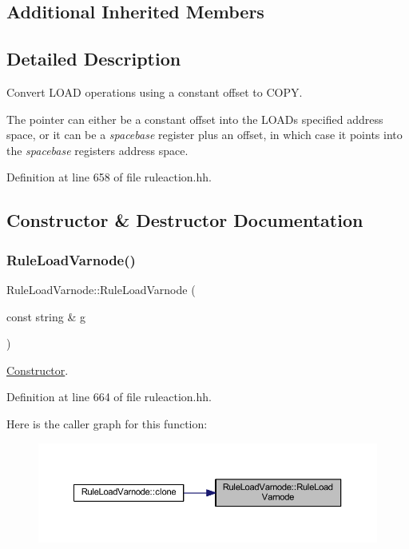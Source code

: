 \subsection*{Additional Inherited Members}


\subsection{Detailed Description}
Convert L\+O\+AD operations using a constant offset to C\+O\+PY. 

The pointer can either be a constant offset into the L\+O\+AD\textquotesingle{}s specified address space, or it can be a {\itshape spacebase} register plus an offset, in which case it points into the {\itshape spacebase} register\textquotesingle{}s address space. 

Definition at line 658 of file ruleaction.\+hh.



\subsection{Constructor \& Destructor Documentation}
\mbox{\label{class_rule_load_varnode_a1e78f437e9ff5a21f6b2fe3ffa97ccda}} 
\subsubsection{\texorpdfstring{RuleLoadVarnode()}{RuleLoadVarnode()}}
{\footnotesize\ttfamily Rule\+Load\+Varnode\+::\+Rule\+Load\+Varnode (\begin{DoxyParamCaption}\item[{const string \&}]{g }\end{DoxyParamCaption})\hspace{0.3cm}{\ttfamily [inline]}}



\mbox{\hyperlink{class_constructor}{Constructor}}. 



Definition at line 664 of file ruleaction.\+hh.

Here is the caller graph for this function\+:
\nopagebreak
\begin{figure}[H]
\begin{center}
\leavevmode
\includegraphics[width=350pt]{class_rule_load_varnode_a1e78f437e9ff5a21f6b2fe3ffa97ccda_icgraph}
\end{center}
\end{figure}


